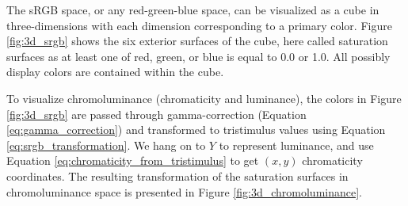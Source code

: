 \documentclass{article}
\begin{document}
\begin{multicols}{2}
The sRGB space, or any red-green-blue space, can be visualized as a cube in three-dimensions with each dimension corresponding to a primary color.  Figure \ref{fig:3d_srgb} shows the six exterior surfaces of the cube, here called saturation surfaces as at least one of red, green, or blue is equal to 0.0 or 1.0.  All possibly display colors are contained within the cube.

To visualize chromoluminance (chromaticity and luminance), the colors in Figure \ref{fig:3d_srgb} are passed through gamma-correction (Equation \ref{eq:gamma_correction}) and transformed to tristimulus values using Equation \ref{eq:srgb_transformation}.  We hang on to $Y$ to represent luminance, and use Equation \ref{eq:chromaticity_from_tristimulus} to get $(x,y)$ chromaticity coordinates.  The resulting transformation of the saturation surfaces in chromoluminance space is presented in Figure \ref{fig:3d_chromoluminance}.


\end{multicols}
\end{document}
